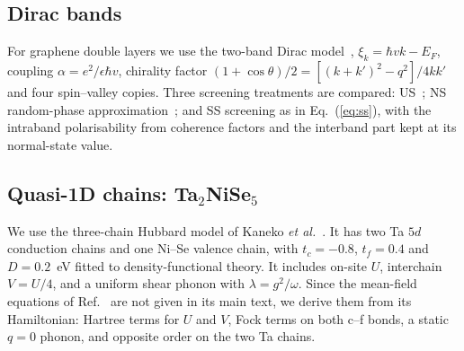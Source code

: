 \documentclass[aip,jap,reprint,amsmath,amssymb]{revtex4-2}
\begin{document}
\subsection{Dirac bands}
For graphene double layers we use the two-band Dirac model~\cite{Min2008}, $\xi_k=\hbar vk-E_F$, coupling $\alpha=e^2/\epsilon\hbar v$, chirality factor
$(1+\cos\theta)/2=[(k+k')^2-q^2]/4kk'$ and four spin--valley copies. Three screening treatments are compared:
US~\cite{Min2008}; NS random-phase approximation~\cite{Kharitonov2008}; and SS screening
as in Eq.~(\ref{eq:ss}), with the intraband polarisability from coherence factors and the interband part kept at its
normal-state value.

\subsection{Quasi-1D chains: Ta$_2$NiSe$_5$}
We use the three-chain Hubbard model of Kaneko \textit{et al.}~\cite{Kaneko2013}. It has two Ta $5d$ conduction chains and one
Ni--Se valence chain, with $t_c=-0.8$, $t_f=0.4$ and $D=0.2$~eV fitted to density-functional theory. It includes on-site $U$, interchain
$V=U/4$, and a uniform shear phonon with $\lambda=g^2/\omega$. Since the mean-field equations of
Ref.~ are not given in its main text, we derive them from its Hamiltonian:
Hartree terms for $U$ and $V$, Fock terms on both c--f bonds, a static $q=0$ phonon, and opposite order on the
two Ta chains.
\end{document}
